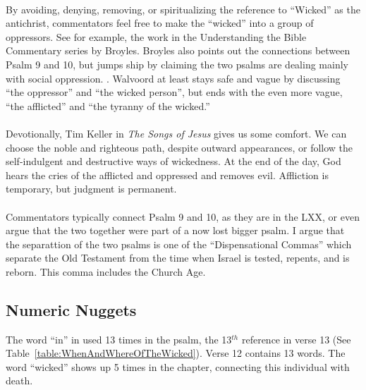 \\
\noindent By avoiding, denying,  removing, or spiritualizing the reference to ``Wicked'' as the antichrist,  commentators feel free to make the ``wicked'' into a group of oppressors. See for example, the work in the Understanding the Bible Commentary series by Broyles. Broyles also points out the connections between Psalm 9 and 10, but jumps ship by claiming the two psalms are dealing mainly with social oppression. \cite{broyles2012psalms}. Walvoord at least stays safe and vague by discussing ``the oppressor'' and ``the wicked person'', but ends with the even more vague, ``the afflicted'' and ``the tyranny of the wicked.'' \cite{walvoord1985bibleknowledgeOT}\\
\\
Devotionally, Tim Keller in \emph{The Songs of Jesus} gives us some comfort. We can choose the noble and righteous path, despite outward appearances, or follow the self-indulgent and destructive ways of wickedness. At the end of the day, God hears the cries of the afflicted and oppressed and removes evil. Affliction is temporary, but judgment is permanent. \cite{keller2015SongsOfrJesus}\\
\\
Commentators typically connect Psalm 9 and 10, as they are in the LXX, or even argue that the two together were part of a now lost bigger psalm. I argue that the separattion of the two psalms is one of the ``Dispensational Commas'' which separate the Old Testament from the time when Israel is tested, repents, and is reborn. This comma includes the Church Age.\cite{wilcock2001Message}

\subsection{Numeric Nuggets}
The word ``in'' in used 13 times in the psalm, the 13$^{th}$ reference in verse 13 (See Table~\ref{table:WhenAndWhereOfTheWicked}). Verse 12 contains 13 words. The word ``wicked'' shows up 5 times in the chapter, connecting this individual with death.


